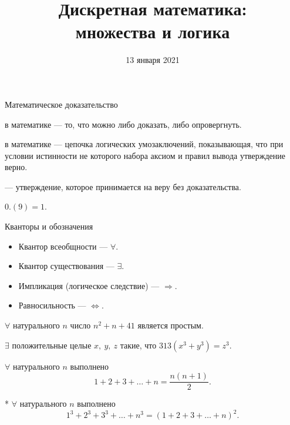 

\date{13 января 2021}		%
\setcounter{s}{1}			%




\title{Дискретная математика:\\
множества и логика}


\begin{frame}
  \titlepage
\end{frame}


\begin{frame}{Математическое доказательство}

 в математике --- то, что можно либо доказать, либо опровергнуть.
\spc

 в математике --- цепочка логических умозаключений, показывающая, что при условии истинности не которого набора аксиом и правил вывода утверждение верно.
\spc

 --- утверждение, которое принимается на веру без доказательства.


\exmpl $0.(9)=1.$

\end{frame}


\begin{frame}{Кванторы и обозначения}

\begin{itemize}

\item Квантор всеобщности --- $\forall.$

\item Квантор существования --- $\exists.$

\item Импликация (логическое следствие) --- $\Longrightarrow.$

\item Равносильность --- $\Longleftrightarrow.$

\end{itemize}

\exmpl $\forall$ натурального $n$ число $n^2+n+41$ является простым.

\exmpl $\exists$ положительные целые $x,\ y,\ z$ такие, что $313(x^3+y^3)=z^3.$

\exmpl $\forall$ натурального $n$ выполнено $$1+2+3+\dots +n=\frac{n(n+1)}{2}.$$

\exmpl \hspace{-2 pt}* $\forall$ натурального $n$ выполнено $$1^3+2^3+3^3+\dots +n^3=(1+2+3+\dots +n)^2.$$

\end{frame}

